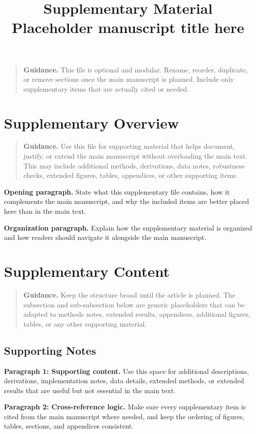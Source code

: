 \documentclass[a4paper,11pt]{article}
\title{Supplementary Material\\Placeholder manuscript title here}
\author{}
\date{}
\newcommand{\draftguidance}[1]{%
\begin{quote}
\small
\textbf{Guidance.} #1
\end{quote}
}
\begin{document}
\maketitle

\draftguidance{This file is optional and modular. Rename, reorder, duplicate, or remove sections once the main manuscript is planned. Include only supplementary items that are actually cited or needed.}

\section*{Supplementary Overview}

\draftguidance{Use this file for supporting material that helps document, justify, or extend the main manuscript without overloading the main text. This may include additional methods, derivations, data notes, robustness checks, extended figures, tables, appendices, or other supporting items.}

\noindent\textbf{Opening paragraph.} State what this supplementary file contains, how it complements the main manuscript, and why the included items are better placed here than in the main text.

\noindent\textbf{Organization paragraph.} Explain how the supplementary material is organized and how readers should navigate it alongside the main manuscript.

\section{Supplementary Content}

\draftguidance{Keep the structure broad until the article is planned. The subsection and sub-subsection below are generic placeholders that can be adapted to methods notes, extended results, appendices, additional figures, tables, or any other supporting material.}

\subsection{Supporting Notes}

\noindent\textbf{Paragraph 1: Supporting content.} Use this space for additional descriptions, derivations, implementation notes, data details, extended methods, or extended results that are useful but not essential in the main text.

\noindent\textbf{Paragraph 2: Cross-reference logic.} Make sure every supplementary item is cited from the main manuscript where needed, and keep the ordering of figures, tables, sections, and appendices consistent.
\end{document}
